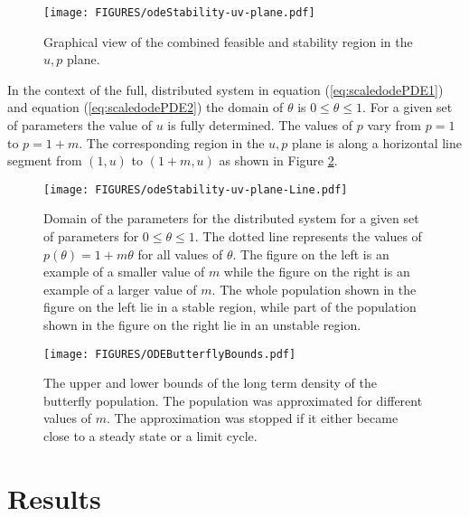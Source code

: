 \documentclass[review]{elsarticle}
\begin{document}
\begin{figure}[htb]
  \centering
  \texttt{[image: FIGURES/odeStability-uv-plane.pdf]}
  \caption[Stability region in the $u,p$ plane.]{Graphical view of the
    combined feasible and stability region in the $u,p$ plane.}
  \label{fig:uvStabilityRegion}
\end{figure}

In the context of the full, distributed system in equation
(\ref{eq:scaledodePDE1}) and equation (\ref{eq:scaledodePDE2}) the
domain of $\theta$ is $0\leq\theta\leq 1$. For a given set of
parameters the value of $u$ is fully determined. The values of $p$
vary from $p=1$ to $p=1+m$.  The corresponding region in the $u,p$
plane is along a horizontal line segment from $(1,u)$ to
$(1+m,u)$ as shown in Figure \ref{fig:distributedLineSegment}.

\begin{figure}[htb]
  \centering
  \texttt{[image: FIGURES/odeStability-uv-plane-Line.pdf]}
  \caption[Domain of the distributed system in the $u,p$
  plane.]{Domain of the parameters for the distributed system for a
    given set of parameters for $0\leq\theta\leq 1$. The dotted line
    represents the values of $p(\theta)=1+m\theta$ for all
    values of $\theta$. The figure on the left is an example of a
    smaller value of $m$ while the figure on the right is an example
    of a larger value of $m$. The whole population shown in the figure
    on the left lie in a stable region, while part of the population
    shown in the figure on the right lie in an unstable region.}
  \label{fig:distributedLineSegment}
\end{figure}

\begin{figure}[htb]
  \centering
  \texttt{[image: FIGURES/ODEButterflyBounds.pdf]}
  \caption[Upper and lower bounds of the butterfly density.]{The upper
    and lower bounds of the long term density of the butterfly
    population. The population was approximated for different values
    of $m$. The approximation was stopped if it either became close to
    a steady state or a limit cycle.}
  \label{fig:odeButterflyBifurcation}
\end{figure}




\section{Results}
\label{section:results}
\end{document}
